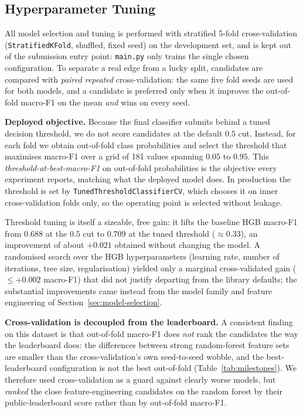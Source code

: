 \documentclass[conference]{IEEEtran}
\begin{document}
\subsection{Hyperparameter Tuning}
\label{sec:tuning}
All model selection and tuning is performed with stratified 5-fold
cross-validation (\texttt{StratifiedKFold}, shuffled, fixed seed) on the
development set, and is kept out of the submission entry point: \texttt{main.py}
only trains the single chosen configuration. To separate a real edge from a lucky
split, candidates are compared with \emph{paired repeated} cross-validation: the
same five fold seeds are used for both models, and a candidate is preferred only
when it improves the out-of-fold macro-F1 on the mean \emph{and} wins on every
seed.

\textbf{Deployed objective.} Because the final classifier submits behind a tuned
decision threshold, we do not score candidates at the default $0.5$ cut. Instead,
for each fold we obtain out-of-fold class probabilities and select the threshold
that maximises macro-F1 over a grid of 181 values spanning $0.05$ to $0.95$. This
\emph{threshold-at-best-macro-F1} on out-of-fold probabilities is the objective
every experiment reports, matching what the deployed model does. In production the
threshold is set by \texttt{TunedThresholdClassifierCV}, which chooses it on inner
cross-validation folds only, so the operating point is selected without leakage.

Threshold tuning is itself a sizeable, free gain: it lifts the baseline HGB
macro-F1 from $0.688$ at the $0.5$ cut to $0.709$ at the tuned threshold
($\approx 0.33$), an improvement of about $+0.021$ obtained without changing the
model. A randomised search over the HGB hyperparameters (learning rate, number of
iterations, tree size, regularisation) yielded only a marginal cross-validated
gain ($\le +0.002$ macro-F1) that did not justify departing from the library
defaults; the substantial improvements came instead from the model family and
feature engineering of Section~\ref{sec:model-selection}.

\textbf{Cross-validation is decoupled from the leaderboard.} A consistent finding
on this dataset is that out-of-fold macro-F1 does \emph{not} rank the candidates
the way the leaderboard does: the differences between strong random-forest feature
sets are smaller than the cross-validation's own seed-to-seed wobble, and the
best-leaderboard configuration is not the best out-of-fold
(Table~\ref{tab:milestones}). We therefore used cross-validation as a guard
against clearly worse models, but \emph{ranked} the close feature-engineering
candidates on the random forest by their public-leaderboard score rather than by
out-of-fold macro-F1.
\end{document}

